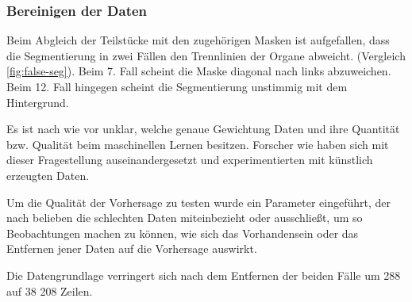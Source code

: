 \subsubsection{Bereinigen der Daten} \label{ssec:clean-data}

Beim Abgleich der Teilstücke mit den zugehörigen Masken ist aufgefallen, dass die Segmentierung in zwei Fällen den Trennlinien der Organe abweicht. (Vergleich \ref{fig:false-seg}). Beim 7. Fall scheint die Maske diagonal nach links abzuweichen. Beim 12. Fall hingegen scheint die Segmentierung unstimmig mit dem Hintergrund.

Es ist nach wie vor unklar, welche genaue Gewichtung Daten und ihre Quantität bzw. Qualität beim maschinellen Lernen besitzen. Forscher wie \citet{Souly2022} haben sich mit dieser Fragestellung auseinandergesetzt und experimentierten mit künstlich erzeugten Daten.

Um die Qualität der Vorhersage zu testen wurde ein Parameter eingeführt, der nach belieben die schlechten Daten miteinbezieht oder ausschließt, um so Beobachtungen machen zu können, wie sich das Vorhandensein oder das Entfernen jener Daten auf die Vorhersage auswirkt.

Die Datengrundlage verringert sich nach dem Entfernen der beiden Fälle um 288 auf 38 208 Zeilen. 

